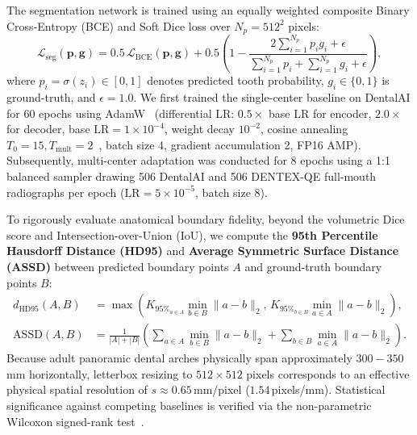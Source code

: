 \documentclass[review]{elsarticle}
\begin{document}
The segmentation network is trained using an equally weighted composite Binary Cross-Entropy (BCE) and Soft Dice loss over $N_p = 512^2$ pixels:
\begin{equation}
    \mathcal{L}_{\text{seg}}(\mathbf{p}, \mathbf{g}) = 0.5\,\mathcal{L}_{\text{BCE}}(\mathbf{p}, \mathbf{g}) + 0.5\left(1 - \frac{2\sum_{i=1}^{N_p} p_i g_i + \epsilon}{\sum_{i=1}^{N_p} p_i + \sum_{i=1}^{N_p} g_i + \epsilon}\right),
    \label{eq:seg_loss}
\end{equation}
where $p_i = \sigma(z_i) \in [0,1]$ denotes predicted tooth probability, $g_i \in \{0,1\}$ is ground-truth, and $\epsilon = 1.0$. We first trained the single-center baseline on DentalAI for 60 epochs using AdamW~\cite{loshchilov2019adamw} (differential LR: $0.5\times$ base LR for encoder, $2.0\times$ for decoder, base $\text{LR} = 1\times 10^{-4}$, weight decay $10^{-2}$, cosine annealing $T_0=15, T_{\text{mult}}=2$~\cite{loshchilov2017cosine}, batch size 4, gradient accumulation 2, FP16 AMP). Subsequently, multi-center adaptation was conducted for 8 epochs using a 1:1 balanced sampler drawing 506 DentalAI and 506 DENTEX-QE full-mouth radiographs per epoch ($\text{LR} = 5\times 10^{-5}$, batch size 8).

To rigorously evaluate anatomical boundary fidelity, beyond the volumetric Dice score and Intersection-over-Union (IoU), we compute the \textbf{95th Percentile Hausdorff Distance (HD95)} and \textbf{Average Symmetric Surface Distance (ASSD)} between predicted boundary points $A$ and ground-truth boundary points $B$:
\begin{align}
    d_{\text{HD95}}(A, B) &= \max\left(K_{95\%}_{a \in A} \min_{b \in B} \|a - b\|_2,\, K_{95\%}_{b \in B} \min_{a \in A} \|a - b\|_2\right), \\
    \text{ASSD}(A, B) &= \frac{1}{|A| + |B|} \left(\sum_{a \in A} \min_{b \in B} \|a - b\|_2 + \sum_{b \in B} \min_{a \in A} \|a - b\|_2\right).
\end{align}
Because adult panoramic dental arches physically span approximately $300 - 350$\,mm horizontally, letterbox resizing to $512 \times 512$ pixels corresponds to an effective physical spatial resolution of $s \approx 0.65$\,mm/pixel ($1.54$\,pixels/mm). Statistical significance against competing baselines is verified via the non-parametric Wilcoxon signed-rank test~\cite{wilcoxon1945individual}.
\end{document}
